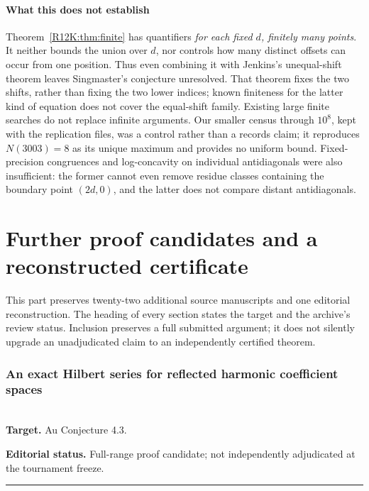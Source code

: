 \documentclass[11pt,a4paper]{article}
\begin{document}
\subsection{What this does not establish}
Theorem~\ref{R12K:thm:finite} has quantifiers \emph{for each fixed \(d\), finitely many points}. It neither bounds the union over \(d\), nor controls how many distinct offsets can occur from one position. Thus even combining it with Jenkins's unequal-shift theorem leaves Singmaster's conjecture unresolved. That theorem fixes the two shifts, rather than fixing the two lower indices; known finiteness for the latter kind of equation does not cover the equal-shift family. Existing large finite searches \cite[Theorem 1]{R12K:blokhuis} do not replace infinite arguments. Our smaller census through \(10^8\), kept with the replication files, was a control rather than a records claim; it reproduces \(N(3003)=8\) as its unique maximum and provides no uniform bound. Fixed-precision congruences and log-concavity on individual antidiagonals were also insufficient: the former cannot even remove residue classes containing the boundary point \((2d,0)\), and the latter does not compare distant antidiagonals.
\endgroup


\clearpage

\part{Further proof candidates and a reconstructed certificate}

\noindent This part preserves twenty-two additional source manuscripts and one editorial reconstruction. The heading of every section states the target and the archive's review status. Inclusion preserves a full submitted argument; it does not silently upgrade an unadjudicated claim to an independently certified theorem.


\section{An exact Hilbert series for reflected harmonic coefficient spaces}
\label{section:R18H}
\\[3pt]
\noindent\textbf{Target.} Au Conjecture 4.3.

\noindent\textbf{Editorial status.} Full-range proof candidate; not independently adjudicated at the tournament freeze. 

\smallskip\hrule\medskip
\end{document}
